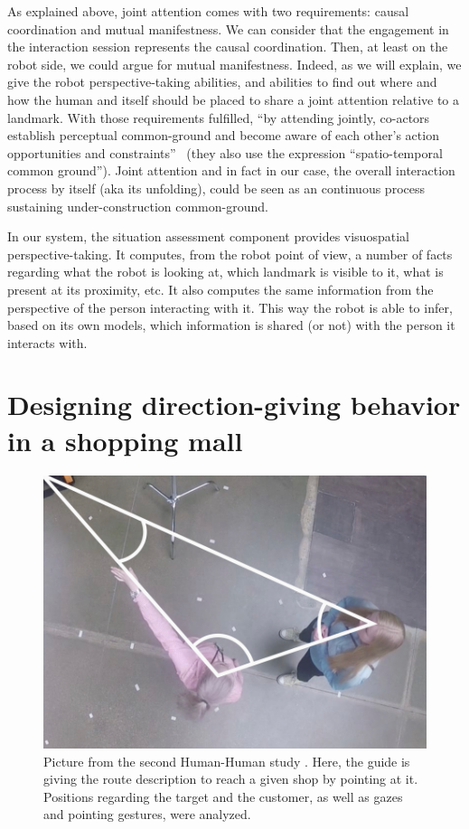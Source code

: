 \documentclass[a4paper,11pt,twoside]{StyleThese}
\begin{document}
As explained above, joint attention comes with two requirements: causal coordination and mutual manifestness. We can consider that the engagement in the interaction session represents the causal coordination. Then, at least on the robot side, we could argue for mutual manifestness. Indeed, as we will explain, we give the robot perspective-taking abilities, and abilities to find out where and how the human and itself should be placed to share a joint attention relative to a landmark. With those requirements fulfilled, ``by attending jointly, co-actors establish perceptual common-ground and become aware of each other's action opportunities and constraints''~\cite{curioni_2017_joint} (they also use the expression ``spatio-temporal common ground''). Joint attention and in fact in our case, the overall interaction process by itself (aka its unfolding), could be seen as an continuous process sustaining under-construction common-ground.

In our system, the situation assessment component provides visuospatial perspective-taking. It computes, from the robot point of view, a number of facts regarding what the robot is looking at, which landmark is visible to it, what is present at its proximity, etc. It also computes the same information from the perspective of the person interacting with it. This way the robot is able to infer, based on its own models, which information is shared (or not) with the person it interacts with.


\section{Designing direction-giving behavior in a shopping mall}
\label{sec:modeling}

\begin{figure}[!t]
	\centering
	\includegraphics[scale=0.7]{figures/chapter3/human_guide.png}
	\caption{\label{fig:chap3_human_guide} Picture from the second Human-Human study \cite{belhassein_2017_human}. Here, the guide is giving the route description to reach a given shop by pointing at it. Positions regarding the target and the customer, as well as gazes and pointing gestures, were analyzed.}
\end{figure}
\end{document}
